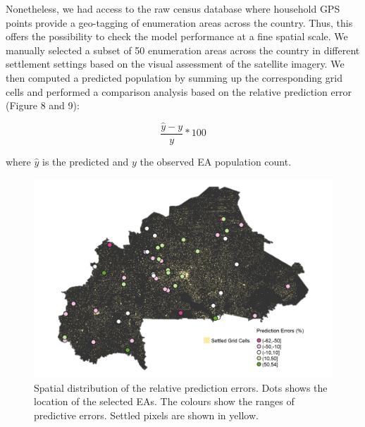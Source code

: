 \documentclass[]{book}
\begin{document}
Nonetheless, we had access to the raw census database where household
GPS points provide a geo-tagging of enumeration areas across the
country. Thus, this offers the possibility to check the model
performance at a fine spatial scale. We manually selected a subset of 50
enumeration areas across the country in different settlement settings
based on the visual assessment of the satellite imagery. We then
computed a predicted population by summing up the corresponding grid
cells and performed a comparison analysis based on the relative
prediction error (Figure 8 and 9):

\[
\frac{\hat{y} - y}{y}*100
\]

where \(\hat{y}\) is the predicted and \(y\) the observed EA population
count.

\begin{figure}

{\centering \includegraphics[width=0.8\linewidth]{dat/BFAv1/map-ea-test} 

}

\caption{Spatial distribution of the relative prediction errors. Dots shows the location of the selected EAs. The colours show the ranges of predictive errors. Settled pixels are shown in yellow.}\label{fig:diff}
\end{figure}
\end{document}
